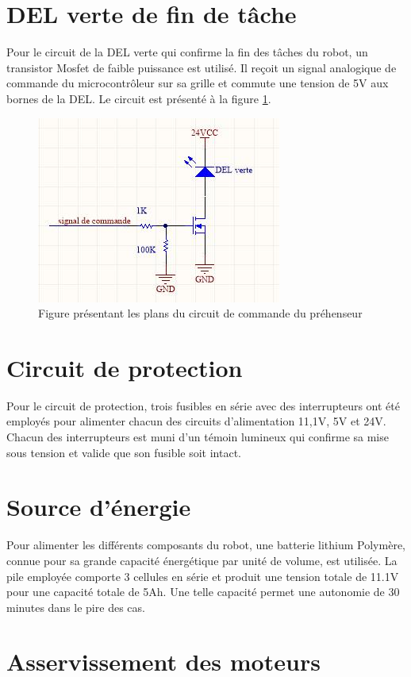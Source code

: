 \section{DEL verte de fin de tâche}
Pour le circuit de la DEL verte qui confirme la fin des tâches du robot, un transistor Mosfet de faible puissance est utilisé. Il reçoit un signal analogique de commande du microcontrôleur sur sa grille et commute une tension de 5V aux bornes de la DEL. Le circuit est présenté à la figure \ref{fig:del_verte}.

\begin{figure}[htbp]
\centering
\includegraphics[scale=0.5]{fig/del_verte.jpg}
\caption{Figure présentant les plans du circuit de commande du préhenseur}
\label{fig:del_verte}
\end{figure}

\section{Circuit de protection}
Pour le circuit de protection, trois fusibles en série avec des interrupteurs ont été employés pour alimenter chacun des circuits d’alimentation 11,1V, 5V et 24V. Chacun des interrupteurs est muni d’un témoin lumineux qui confirme sa mise sous tension et valide que son fusible soit intact.

\section{Source d'énergie}
Pour alimenter les différents composants du robot, une batterie lithium Polymère, connue pour sa grande capacité énergétique par unité de volume, est utilisée. La pile employée comporte 3 cellules en série et produit une tension totale de 11.1V pour une capacité totale de 5Ah. Une telle capacité permet une autonomie de 30 minutes dans le pire des cas.


\section{Asservissement des moteurs}
